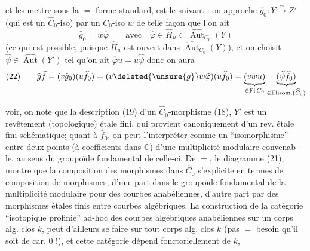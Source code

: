 et les mettre sous la $=$ forme standard,
est le suivant : on approche $\widehat g_0:Y\overset{\sim}{\longrightarrow}Z'$
(qui est un $\widehat C_0$-iso) par
un  $C_0$-iso   $w$
de telle façon que l'on ait
\[
\widehat g_0=w\widehat\varphi\qquad\text{avec}\quad\widehat\varphi\in\widehat H_u\subset\widehat{\operatorname{Aut}}_{C_0}(Y)
\]
(ce qui est possible, puisque $\widehat H_u$ est ouvert dans $\widehat{\operatorname{Aut}}_{C_0}(Y)$),
et on choisit $\widehat\psi\in\widehat{\operatorname{Aut}}(Y')$ tel qu'on ait $\widehat\varphi u=u\widehat\psi$
donc on aura
\[
(22)\qquad\widehat g\widehat f=(v\widehat g_0)(u\widehat f_0)
=(v\deleted{\unsure{g}}w\widehat\varphi)(u\widehat f_0)
=\underbrace{(vwu)}_{\in\mathrm{Fl}\,C_0}\underbrace{(\widehat\psi\widehat f_0)}_{\in\mathrm{Flisom.}(\widehat C_0)}
\]

voir, on note que  la description (19) d'un
$\widehat C_0$-morphisme (18), $Y'$ est un revêtement (topologique)
étale fini, qui provient canoniquement
d'un rev. étale fini schématique; quant à
$\widehat f_0$, on peut l'interpréter comme un
``isomorphisme''   entre deux points (à coefficients
dans $\mathbb C$) d'une multiplicité modulaire convenab-
le, au sens du groupoïde fondamental
de celle-ci. De $=$, le diagramme (21),
montre que la composition des morphismes
dans $\widehat C_0$ s'explicite en termes de composition
de morphismes, d'une part dans le groupoïde
fondamental de la multiplicité modulaire
pour des courbes anabéliennes, d'autre part
par des morphismes étales finis entre courbes
algébriques. La construction de la catégorie
``isotopique profinie'' ad-hoc des courbes algébriques anabéliennes
sur un corps alg. clos $k$, peut d'ailleurs
se faire sur tout corps alg. clos $k$
(pas $=$ besoin qu'il soit de car. $0$ !), et
cette catégorie dépend fonctoriellement de $k$,

